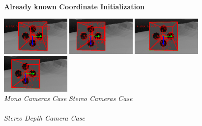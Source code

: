 \begin{figure}[H]
	\begin{center}
		\textbf{Already known Coordinate Initialization}
	\end{center}
	\vspace{-10px}	
   	\includegraphics[width=3.4cm]{tracking/click/mono_left.png}
	\includegraphics[width=3.4cm]{tracking/click/mono_right.png}
	\hspace{10px}
	\includegraphics[width=3.4cm]{tracking/click/stereo_left.png}
	\includegraphics[width=3.4cm]{tracking/click/stereo_right.png}\\
	{\footnotesize \hspace*{20px}\textit{Mono Cameras Case} \hspace{120px} \textit{Stereo Cameras Case}}\\
	\\
    {\footnotesize \textit{Stereo Depth Camera Case}}\\  
\end{figure}
